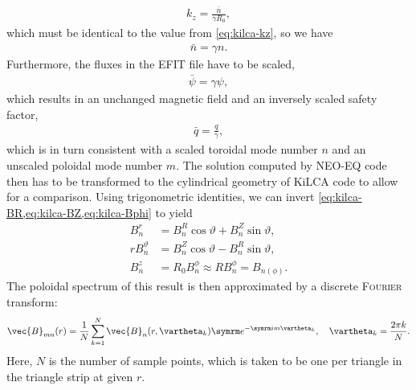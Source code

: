 \begin{gather}
  k_{z} = \frac{\bar{n}}{\gamma R_{0}},
\end{gather}
which must be identical to the value from \cref{eq:kilca-kz}, so we have
\begin{gather}
  \bar{n} = \gamma n.
\end{gather}
Furthermore, the fluxes in the EFIT file have to be scaled,
\begin{gather}
  \bar{\psi} = \gamma \psi,
\end{gather}
which results in an unchanged magnetic field and an inversely scaled safety factor,
\begin{gather}
  \bar{q} = \frac{q}{\gamma},
\end{gather}
which is in turn consistent with a scaled toroidal mode number $n$ and an unscaled poloidal mode number $m$. The solution computed by NEO-EQ code then has to be transformed to the cylindrical geometry of KiLCA code to allow for a comparison. Using trigonometric identities, we can invert \cref{eq:kilca-BR,eq:kilca-BZ,eq:kilca-Bphi} to yield
\begin{align}
  B_{n}^{r} &= B_{n}^{R} \cos \vartheta + B_{n}^{Z} \sin \vartheta, \\
  r B_{n}^{\vartheta} &= B_{n}^{Z} \cos \vartheta - B_{n}^{R} \sin \vartheta, \\
  B_{n}^{z} &= R_{0} B_{n}^{\phi} \approx R B_{n}^{\phi} = B_{n (\phi)}.
\end{align}
The poloidal spectrum of this result is then approximated by a discrete \textsc{Fourier} transform:
\begin{gather}
  \vec{B}_{m n} (r) = \frac{1}{N} \sum_{k = 1}^{N} \vec{B}_{n} (r, \vartheta_{k}) \e^{-\im m \vartheta_{k}}, \quad \vartheta_{k} = \frac{2 \pi k}{N}. \label{eq:DTFT}
\end{gather}
Here, $N$ is the number of sample points, which is taken to be one per triangle in the triangle strip at given $r$.

